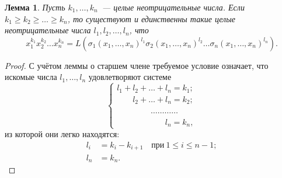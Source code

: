 \documentclass[a4paper,10pt]{amsart}
\newtheorem{lemma}{Лемма}
\theoremstyle{definition}
\theoremstyle{remark}
\begin{document}
\begin{lemma} \label{lemma_2}
Пусть $k_1, \ldots, k_n$~--- целые неотрицательные числа. Если $k_1
\geqslant k_2 \geqslant \ldots \geqslant k_n$, то существуют и
единственны такие целые неотрицательные числа $l_1, l_2, \ldots,
l_n$, что
$$
x_1^{k_1}x_2^{k_2}\ldots x_n^{k_n}=
L(\sigma_1(x_1,\ldots,x_n)^{l_1}\sigma_2(x_1,\ldots,x_n)^{l_2}\ldots\sigma_n(x_1,\ldots,x_n)^{l_n}).
$$
\end{lemma}

\begin{proof}
С учётом леммы о старшем члене требуемое условие означает, что
искомые числа $l_1, \ldots, l_n$ удовлетворяют системе
$$
\begin{cases}
l_1 + l_2 + \ldots + l_n = k_1; \\
\phantom{l_1 + {}} l_2 + \ldots + l_n = k_2;\\
\phantom{l_1 + l_2 + .} \ldots\ldots\ldots\ldots\\
\phantom{l_1 + l_s + \ldots + {}} l_n = k_n,
\end{cases}
$$
из которой они легко находятся:
\begin{align*}
l_i &= k_i - k_{i+1} \quad \text{при} \ 1 \leqslant i \leqslant n-1; \\
l_n &= k_n.
\end{align*}
\end{proof}
\end{document}
